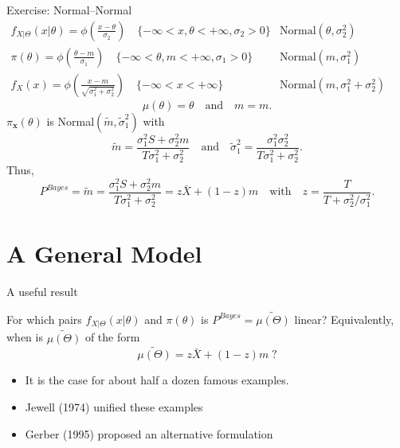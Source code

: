 \documentclass[11pt]{beamer}
\begin{document}
\begin{frame}[t]{Exercise: Normal--Normal}
\renewcommand{\arraystretch}{1.5}$
\begin{array}{ll}
f_{X|\Theta}(x|\theta)=\phi\left(\frac{x-\theta}{\sigma_2}\right) \quad\{-\infty<x,\theta<+\infty,\sigma_2>0\} & \text{Normal}(\theta,\sigma_2^2) \\
\pi(\theta)=\phi\left(\frac{\theta-m}{\sigma_1}\right) \quad\{-\infty<\theta,m<+\infty,\sigma_1>0\} & \text{Normal}(m,\sigma_1^2) \\
f_X(x)=\phi\left(\frac{x-m}{\sqrt{\sigma_1^2+\sigma_2^2}}\right) \quad\{-\infty<x<+\infty\} & \!\!\!\!\!\!\!\!\text{Normal}(m,\sigma_1^2+\sigma_2^2)
\end{array}$
$$\mu(\theta)=\theta \quad\text{and}\quad m=m.$$
$\pi_\mathbf{x}(\theta)$ is Normal$(\widetilde{m},\widetilde{\sigma}_1^2)$ with
$$\widetilde{m}=\frac{\sigma_1^2S+\sigma_2^2m}{T\sigma_1^2+\sigma_2^2} \quad\text{and}\quad \widetilde{\sigma}_1^2=\frac{\sigma_1^2\sigma_2^2}{T\sigma_1^2+\sigma_2^2}. $$
Thus,
$$P^{Bayes}=\widetilde{m}=\frac{\sigma_1^2S+\sigma_2^2m}{T\sigma_1^2+\sigma_2^2} =z\bar{X}+(1-z)m
\quad\text{with}\quad z=\frac{T}{T+\sigma_2^2/\sigma_1^2}. $$
\end{frame}
\section{A General Model}
\begin{frame}{A useful result}

For which pairs $f_{X|\Theta}(x|\theta)$ and $\pi(\theta)$ is $P^{Bayes}=\widetilde{\mu(\Theta)}$ linear? Equivalently, when is $\widetilde{\mu(\Theta)}$ of the form
$$\widetilde{\mu(\Theta)}=z \bar{X} + (1-z)m\;?$$
\begin{itemize}
\item It is the case for about half a dozen famous examples.
\item Jewell (1974) unified these examples
\item Gerber (1995) proposed an alternative formulation
\end{itemize}
\end{frame}
\end{document}
